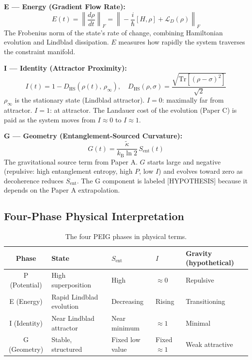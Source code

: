\documentclass[12pt,letterpaper]{article}
\theoremstyle{plain}
\theoremstyle{definition}
\theoremstyle{remark}
\newcommand{\kB}{k_{\mathrm{B}}}
\newcommand{\Sent}{S_{\mathrm{ent}}}
\begin{document}
\textbf{E --- Energy (Gradient Flow Rate):}
\begin{equation}
  E(t) = \left\|\frac{d\rho}{dt}\right\|_F
  = \left\|\!-\frac{i}{\hbar}[H,\rho] + \mathcal{L}_D(\rho)\right\|_F
  \tag{S1.3}
\end{equation}
The Frobenius norm of the state's rate of change, combining Hamiltonian
evolution and Lindblad dissipation. $E$ measures how rapidly the system
traverses the constraint manifold.

\textbf{I --- Identity (Attractor Proximity):}
\begin{equation}
  I(t) = 1 - D_{\mathrm{HS}}(\rho(t),\,\rho_\infty),\quad
  D_{\mathrm{HS}}(\rho,\sigma)
  = \frac{\sqrt{\mathrm{Tr}[(\rho-\sigma)^2]}}{\sqrt{2}}
  \tag{S1.4}
\end{equation}
$\rho_\infty$ is the stationary state (Lindblad attractor). $I = 0$:
maximally far from attractor. $I = 1$: at attractor. The Landauer cost
of the evolution (Paper C) is paid as the system moves from $I \approx 0$
to $I \approx 1$.

\textbf{G --- Geometry (Entanglement-Sourced Curvature):}
\begin{equation}
  G(t) = \frac{\tilde\kappa}{\kB\ln2}\,\Sent(t)
  \tag{S1.5}
\end{equation}
The gravitational source term from Paper A. $G$ starts large and negative
(repulsive: high entanglement entropy, high $P$, low $I$) and evolves
toward zero as decoherence reduces $\Sent$. The G component is labeled
[HYPOTHESIS] because it depends on the Paper A extrapolation.

\subsection{Four-Phase Physical Interpretation}

\begin{table}[H]
\centering
\caption{The four PEIG phases in physical terms.}
\renewcommand{\arraystretch}{1.3}
\begin{tabular}{@{}cllll@{}}
\toprule
\textbf{Phase} & \textbf{State} & \textbf{$S_{\mathrm{ent}}$} &
  \textbf{$I$} & \textbf{Gravity (hypothetical)} \\
\midrule
P (Potential)
  & High superposition
  & High
  & $\approx 0$
  & Repulsive \\
E (Energy)
  & Rapid Lindblad evolution
  & Decreasing
  & Rising
  & Transitioning \\
I (Identity)
  & Near Lindblad attractor
  & Near minimum
  & $\approx 1$
  & Minimal \\
G (Geometry)
  & Stable, structured
  & Fixed low value
  & Fixed $\approx 1$
  & Weak attractive \\
\bottomrule
\end{tabular}
\end{table}
\end{document}
